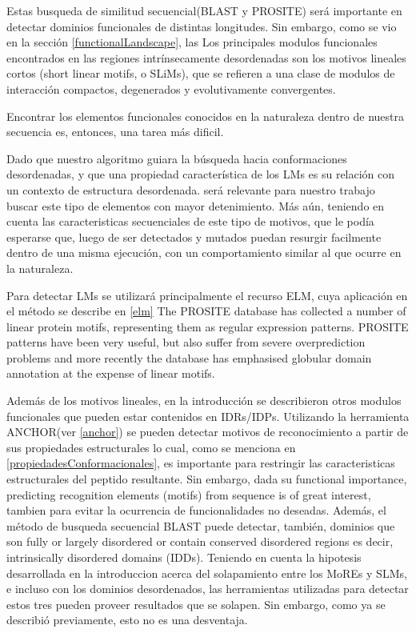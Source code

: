 Estas busqueda de similitud secuencial(BLAST y PROSITE) será importante en detectar dominios funcionales de distintas longitudes. 
Sin embargo, como se vio en la sección \ref{functionalLandscape}, las   
Los principales modulos funcionales encontrados en las regiones intrínsecamente desordenadas son los motivos lineales cortos (short linear motifs, o SLiMs), que se refieren a una clase de modulos de interacción compactos, 
degenerados y evolutivamente convergentes.


Encontrar los elementos funcionales conocidos en la naturaleza dentro de nuestra secuencia es, entonces, una tarea más dificil.
 
Dado que nuestro algoritmo guiara la búsqueda hacia conformaciones desordenadas, y que una propiedad característica de los LMs es su relación con un contexto de estructura desordenada\cite{fuxreiter2007local}.
será relevante para nuestro trabajo buscar este tipo de elementos con mayor detenimiento. Más aún, teniendo en cuenta las caracteristicas secuenciales de este tipo de motivos, que le 
podía esperarse que, luego de ser detectados y mutados puedan resurgir facilmente dentro de una misma ejecución, con un comportamiento similar al que ocurre en la naturaleza.




Para detectar LMs se utilizará principalmente el recurso ELM, cuya aplicación en el método se describe en \ref{elm}
The PROSITE database has collected a number of linear protein motifs, representing them as regular expression patterns. 
PROSITE patterns have been very useful, but also suffer from severe overprediction problems and more recently the database has emphasised globular domain annotation at the expense of linear motifs.




Además de los motivos lineales, en la introducción se describieron otros modulos funcionales que pueden estar contenidos en IDRs/IDPs.
Utilizando la herramienta ANCHOR(ver \ref{anchor}) se pueden detectar motivos de reconocimiento a partir de sus propiedades estructurales lo cual, como se menciona en \ref{propiedadesConformacionales}, es importante para restringir las 
caracteristicas estructurales del peptido resultante. Sin embargo, dada su functional importance, predicting recognition elements (motifs) from sequence is of great interest, tambien para evitar la ocurrencia de funcionalidades no deseadas.
Además, el método de busqueda secuencial BLAST puede detectar, también, dominios que son fully or largely disordered or contain conserved disordered regions es decir, intrinsically disordered domains (IDDs).
Teniendo en cuenta la hipotesis desarrollada en la introduccion acerca del solapamiento entre los MoREs y SLMs, e incluso con los dominios desordenados, las herramientas utilizadas para detectar estos tres pueden proveer resultados que se solapen.
Sin embargo, como ya se describió previamente, esto no es una desventaja.



